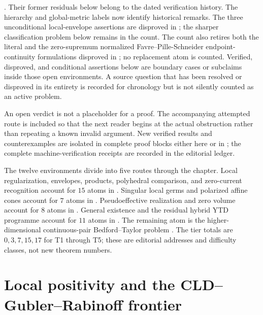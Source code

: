 .  Their former
residuals below belong to the dated verification history.  The hierarchy
and global-metric labels now identify historical remarks.
The three unconditional local-envelope assertions are disproved in
; the sharper classification problem
below remains in the count.
The count also retires both the literal and the zero-supremum normalized
Favre--Pille-Schneider endpoint-continuity formulations disproved in
; no replacement atom
is counted.
Verified, disproved, and conditional assertions below are boundary cases or
subclaims inside those open environments.  A source question that has been
resolved or disproved in its entirety is recorded for chronology but is not
silently counted as an active problem.

An open verdict is not a placeholder for a proof.  The accompanying attempted
route is included so that the next reader begins at the actual obstruction
rather than repeating a known invalid argument.  New verified results and
counterexamples are isolated in complete proof blocks either here or in
; the complete machine-verification receipts
are recorded in the editorial ledger.

The twelve environments divide into five routes through the chapter.
Local regularization, envelopes, products, polyhedral comparison, and
zero-current recognition account for \(15\) atoms in
.
Singular local germs and polarized affine cones account for \(7\) atoms in
.
Pseudoeffective realization and zero volume account for \(8\) atoms in
.
General existence and the residual hybrid YTD programme account for
\(11\) atoms in .
The remaining atom is the higher-dimensional continuous-pair
Bedford--Taylor problem .
The tier totals are \(0,3,7,15,17\) for T1 through T5; these are editorial
addresses and difficulty classes, not new theorem numbers.

\section{Local positivity and the CLD--Gubler--Rabinoff frontier}
\label{sec:ch72-local-frontier}

